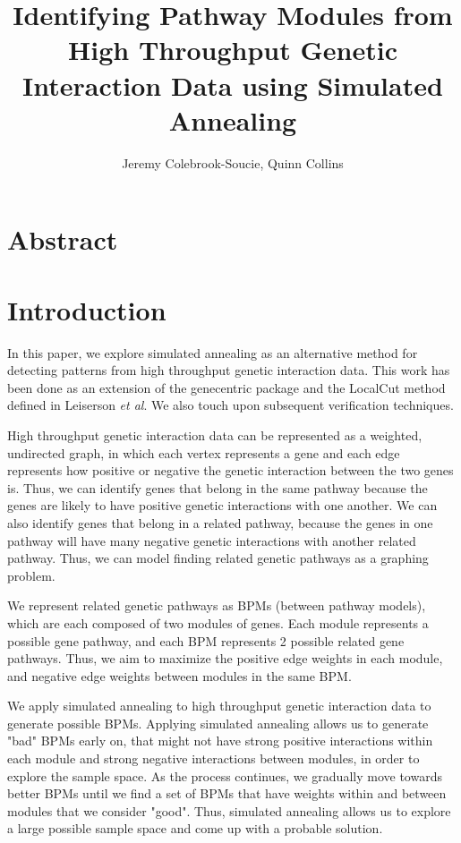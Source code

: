 \documentclass[11pt]{article}
\title{Identifying Pathway Modules from High Throughput Genetic Interaction Data using Simulated Annealing}
\author{Jeremy Colebrook-Soucie, Quinn Collins}
\begin{document}
\maketitle


\section{Abstract}


\section{Introduction}

\par In this paper, we explore simulated annealing as an alternative method for detecting patterns from high throughput genetic interaction data. This work has been done as an extension of the genecentric package and the LocalCut method defined in Leiserson \textit{et al}. We also touch upon subsequent verification techniques.

\par High throughput genetic interaction data can be represented as a weighted, undirected graph, in which each vertex represents a gene and each edge represents how positive or negative the genetic interaction between the two genes is. Thus, we can identify genes that belong in the same pathway because the genes are likely to have positive genetic interactions with one another. We can also identify genes that belong in a related pathway, because the genes in one pathway will have many negative genetic interactions with another related pathway. Thus, we can model finding related genetic pathways as a graphing problem. 

\par We represent related genetic pathways as BPMs (between pathway models), which are each composed of two modules of genes. Each module represents a possible gene pathway, and each BPM represents 2 possible related gene pathways. Thus, we aim to maximize the positive edge weights in each module, and negative edge weights between modules in the same BPM. 

\par We apply simulated annealing to high throughput genetic interaction data to generate possible BPMs. Applying simulated annealing allows us to generate "bad" BPMs early on, that might not have strong positive interactions within each module and strong negative interactions between modules, in order to explore the sample space. As the process continues, we gradually move towards better BPMs until we find a set of BPMs that have weights within and between modules that we consider "good". Thus, simulated annealing allows us to explore a large possible sample space and come up with a probable solution. 
\end{document}
